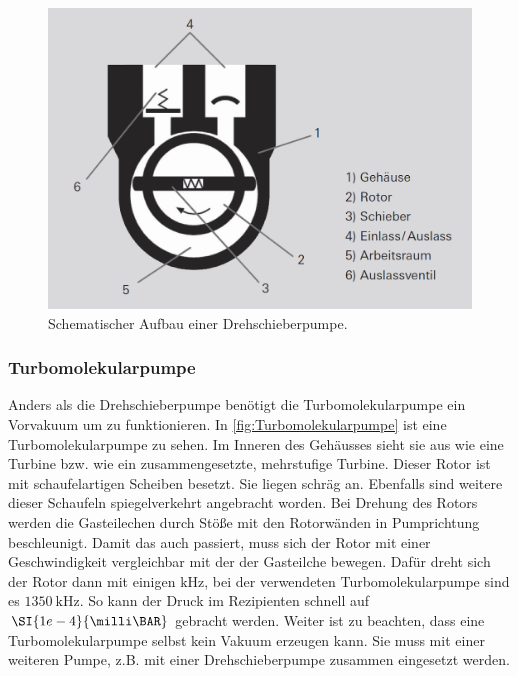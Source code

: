         \begin{figure}[H]
            \centering
            \includegraphics[width=\textwidth]{bilder/Drehschieberpumpe.png}
            \caption{Schematischer Aufbau einer Drehschieberpumpe.\cite{Pfeiffer}}
            \label{fig:Drehschieberpumpe}
        \end{figure}

        \subsubsection{Turbomolekularpumpe}
            Anders als die Drehschieberpumpe benötigt die Turbomolekularpumpe ein Vorvakuum um zu funktionieren.
            In \autoref{fig:Turbomolekularpumpe} ist eine Turbomolekularpumpe zu sehen.
            Im Inneren des Gehäusses sieht sie aus wie eine Turbine bzw. wie ein zusammengesetzte, mehrstufige Turbine.
            Dieser Rotor ist mit schaufelartigen Scheiben besetzt.
            Sie liegen schräg an.
            Ebenfalls sind weitere dieser Schaufeln spiegelverkehrt angebracht worden.
            Bei Drehung des Rotors werden die Gasteilechen durch Stöße mit den Rotorwänden in Pumprichtung beschleunigt.
            Damit das auch passiert, muss sich der Rotor mit einer Geschwindigkeit vergleichbar mit der der Gasteilche bewegen.
            Dafür dreht sich der Rotor dann mit einigen $\si{\kilo\hertz}$, bei der verwendeten Turbomolekularpumpe sind es $\SI{1350}{\kilo\hertz}$.
            So kann der Druck im Rezipienten schnell auf $\SI{1e-4}{\milli\BAR}$ gebracht werden.
            Weiter ist zu beachten, dass eine Turbomolekularpumpe selbst kein Vakuum erzeugen kann. 
            Sie muss mit einer weiteren Pumpe, z.B. mit einer Drehschieberpumpe zusammen eingesetzt werden.

